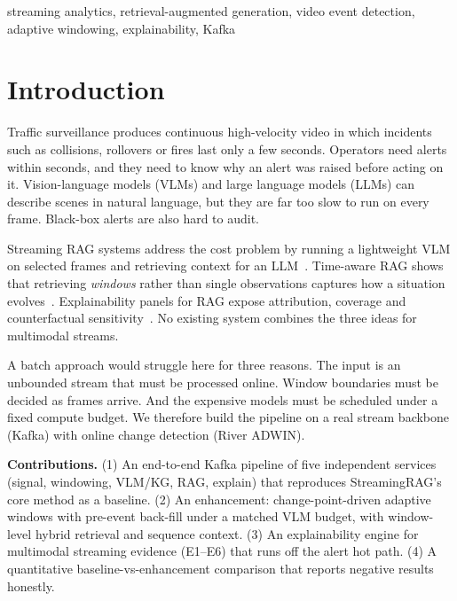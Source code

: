 \documentclass[conference]{IEEEtran}
\begin{document}
\begin{IEEEkeywords}
streaming analytics, retrieval-augmented generation, video event detection, adaptive windowing, explainability, Kafka
\end{IEEEkeywords}

\section{Introduction}
Traffic surveillance produces continuous high-velocity video in which incidents such as collisions,
rollovers or fires last only a few seconds. Operators need alerts within seconds, and they need to know why
an alert was raised before acting on it. Vision-language models (VLMs) and large language models (LLMs)
can describe scenes in natural language, but they are far too slow to run on every frame. Black-box
alerts are also hard to audit.

Streaming RAG systems address the cost problem by running a lightweight VLM on selected frames and
retrieving context for an LLM~\cite{streamingrag}. Time-aware RAG shows that retrieving \emph{windows}
rather than single observations captures how a situation evolves~\cite{tdrag}. Explainability panels for RAG
expose attribution, coverage and counterfactual sensitivity~\cite{citycopilot}. No existing system combines
the three ideas for multimodal streams.

A batch approach would struggle here for three reasons. The input is an unbounded stream that must be
processed online. Window boundaries must be decided as frames arrive. And the expensive models must be
scheduled under a fixed compute budget. We therefore build the pipeline on a real stream backbone (Kafka)
with online change detection (River ADWIN).

\textbf{Contributions.}
(1) An end-to-end Kafka pipeline of five independent services (signal, windowing, VLM/KG, RAG, explain) that
reproduces StreamingRAG's core method as a baseline.
(2) An enhancement: change-point-driven adaptive windows with pre-event back-fill under a matched VLM budget,
with window-level hybrid retrieval and sequence context.
(3) An explainability engine for multimodal streaming evidence (E1--E6) that runs off the alert hot path.
(4) A quantitative baseline-vs-enhancement comparison that reports negative results honestly.

\end{document}
